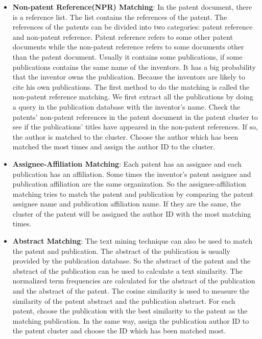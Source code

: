 \begin{itemize}

\item \textbf{Non-patent Reference(NPR) Matching}:
In the patent document, there is a reference list. The list contains the references of the patent. The references of the patents can be divided into two categories: patent reference and non-patent reference. Patent reference refers to some other patent documents while the non-patent reference refers to some documents other than the patent document. Usually it contains some publications, if some publications contains the same name of the inventors. It has a big probability that the inventor owns the publication. Because the inventors are likely to cite his own publications. The first method to do the matching is called the non-patent reference matching. We first extract all the publications by doing a query in the publication database with the inventor's name. Check the patents' non-patent references in the patent document in the patent cluster to see if the publications' titles have appeared in the non-patent references. If so, the author is matched to the cluster. Choose the author which has been matched the most times and assign the author ID to the cluster.

\item \textbf{Assignee-Affiliation Matching}:
Each patent has an assignee and each publication has an affiliation. Some times the inventor's patent assignee and publication affiliation are the same organization. So the assignee-affiliation matching tries to match the patent and publication by comparing the patent assignee name and publication affiliation name. If they are the same, the cluster of the patent will be assigned the author ID with the most matching times.

\item \textbf{Abstract Matching}:
The text mining technique can also be used to match the patent and publication. The abstract of the publication is usually provided by the publication database. So the abstract of the patent and the abstract of the publication can be used to calculate a text similarity. The normalized term frequencies are calculated for the abstract of the publication and the abstract of the patent. The cosine similarity is used to measure the similarity of the patent abstract and the publication abstract. For each patent, choose the publication with the best similarity to the patent as the matching publication. In the same way, assign the publication author ID to the patent cluster and choose the ID which has been matched most. 
 
\end{itemize}

